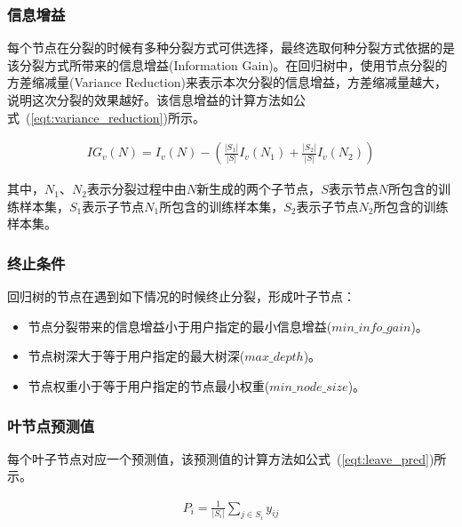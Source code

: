 \documentclass[a4paper,11pt,         %
               ]{article}
\begin{document}
\subsubsection{信息增益}

每个节点在分裂的时候有多种分裂方式可供选择，最终选取何种分裂方式依据的是该分裂方式所带来的信息增益(Information Gain)。在回归树中，使用节点分裂的方差缩减量(Variance Reduction)来表示本次分裂的信息增益，方差缩减量越大，说明这次分裂的效果越好。该信息增益的计算方法如公式~(\ref{eqt:variance_reduction})所示。

\begin{eqnarray}
	\label{eqt:variance_reduction}
IG_{v}(N) = I_{v}(N) - \left ( \frac{\left | S_{1}\right |}{\left | S \right |} I_{v}\left ( N_{1} \right ) + \frac{\left | S_{2}\right |}{\left | S \right |} I_{v}\left ( N_{2} \right )\right)
\end{eqnarray}

其中，$N_{1}$、$N_{2}$表示分裂过程中由$N$新生成的两个子节点，$S$表示节点$N$所包含的训练样本集，$S_{1}$表示子节点$N_{1}$所包含的训练样本集，$S_{2}$表示子节点$N_{2}$所包含的训练样本集。

\subsubsection{终止条件}

回归树的节点在遇到如下情况的时候终止分裂，形成叶子节点：

\begin{itemize}
\item 节点分裂带来的信息增益小于用户指定的最小信息增益($min\_info\_gain$)。
\item 节点树深大于等于用户指定的最大树深($max\_depth$)。
\item 节点权重小于等于用户指定的节点最小权重($min\_node\_size$)。
\end{itemize}

\subsubsection{叶节点预测值}

每个叶子节点对应一个预测值，该预测值的计算方法如公式~(\ref{eqt:leave_pred})所示。

\begin{eqnarray}
	\label{eqt:leave_pred}
P_{i} = \frac{1}{\left | S_{i} \right |} \sum_{j \in S_{i}} y_{ij}
\end{eqnarray}
\end{document}

